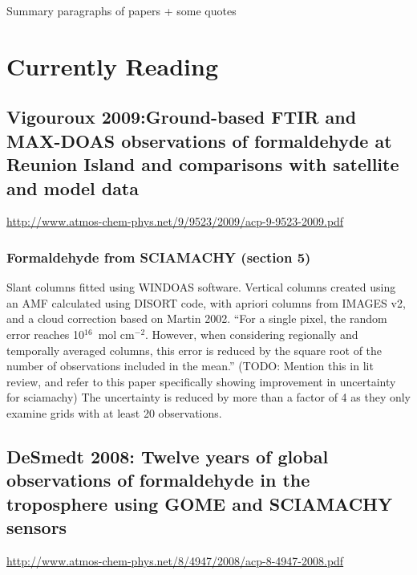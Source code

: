 \documentclass[11pt]{article} %
\begin{document}

\begin{titlepage}
\begin{center}
Summary paragraphs of papers + some quotes

\end{center}
\end{titlepage}

\tableofcontents %
\listoffigures %
\listoftables %


\section{Currently Reading}
  \subsection{Vigouroux 2009:Ground-based FTIR and MAX-DOAS observations of formaldehyde at Reunion Island and comparisons with satellite and model data}
  \url{http://www.atmos-chem-phys.net/9/9523/2009/acp-9-9523-2009.pdf}
  \citet{Vigouroux2009}
    \subsubsection{Formaldehyde from SCIAMACHY (section 5)}
      Slant columns fitted using WINDOAS software.
      Vertical columns created using an AMF calculated using DISORT code, with apriori columns from IMAGES v2, and a cloud correction based on Martin 2002.
      ``For  a  single  pixel,  the  random  error  reaches  10$^{16}$~mol cm$^{-2}$.
      However, when considering regionally and temporally averaged columns, this error is reduced by the square root of the number of observations included in the mean.''
      (TODO: Mention this in lit review, and refer to this paper specifically showing improvement in uncertainty for sciamachy)
      The uncertainty is reduced by more than a factor of 4 as they only examine grids with at least 20 observations.
      
  \subsection{DeSmedt 2008: Twelve years of global observations of formaldehyde in the troposphere using GOME and SCIAMACHY sensors}
  \url{http://www.atmos-chem-phys.net/8/4947/2008/acp-8-4947-2008.pdf}
  \citet{DeSmedt2008}
  
\end{document}
